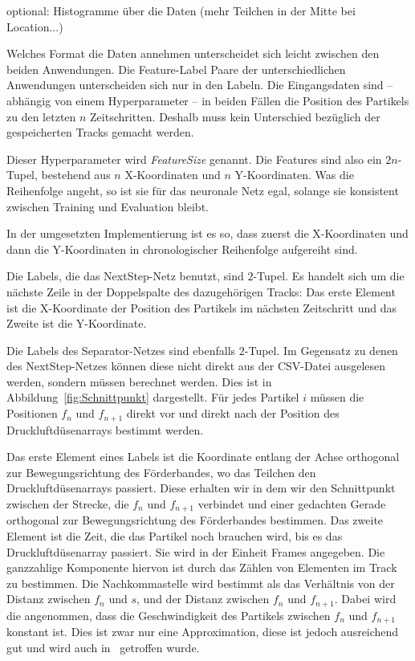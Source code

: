 optional: Histogramme über die Daten (mehr Teilchen in der Mitte bei Location...)
\color{black}

Welches Format die Daten annehmen unterscheidet sich leicht zwischen den beiden Anwendungen.
Die Feature-Label Paare der unterschiedlichen Anwendungen unterscheiden sich nur in den Labeln.
Die Eingangsdaten sind -- abhängig von einem Hyperparameter --
in beiden Fällen die Position des Partikels zu den letzten \(n\) Zeitschritten.
Deshalb muss kein Unterschied bezüglich der gespeicherten Tracks gemacht werden.

Dieser Hyperparameter wird \textit{FeatureSize} genannt. 
Die Features sind also ein \(2n\)-Tupel, bestehend aus \(n\) X-Koordinaten und \(n\) Y-Koordinaten.
Was die Reihenfolge angeht, so ist sie für das neuronale Netz egal, solange sie konsistent zwischen Training und Evaluation bleibt.

In der umgesetzten Implementierung ist es so, dass zuerst die X-Koordinaten 
und dann die Y-Koordinaten in chronologischer Reihenfolge aufgereiht sind. 



Die Labels, die das NextStep-Netz benutzt, sind \(2\)-Tupel.
Es handelt sich um die nächste Zeile in der Doppelspalte des dazugehörigen Tracks:
Das erste Element ist die X-Koordinate der Position des Partikels im nächsten Zeitschritt und das Zweite ist die Y-Koordinate.

Die Labels des Separator-Netzes sind ebenfalls \(2\)-Tupel.
Im Gegensatz zu denen des NextStep-Netzes können diese nicht direkt aus der CSV-Datei ausgelesen werden, sondern müssen berechnet werden.
Dies ist in Abbildung~\ref{fig:Schnittpunkt} dargestellt.
Für jedes Partikel \(i\) müssen die Positionen \(f_n\) und \(f_{n+1}\) direkt vor 
und direkt nach der Position des Druckluftdüsenarrays bestimmt werden.

Das erste Element eines Labels ist die Koordinate entlang der Achse orthogonal zur Bewegungsrichtung des Förderbandes, wo das Teilchen den Druckluftdüsenarrays passiert.
Diese erhalten wir in dem wir den Schnittpunkt zwischen der Strecke, die \(f_n\) und \(f_{n+1}\) verbindet und 
einer gedachten Gerade orthogonal zur Bewegungsrichtung des Förderbandes bestimmen.
Das zweite Element ist die Zeit, die das Partikel noch brauchen wird, bis es das Druckluftdüsenarray passiert.
Sie wird in der Einheit Frames angegeben.
Die ganzzahlige Komponente hiervon ist durch das Zählen von Elementen im Track zu bestimmen.
Die Nachkommastelle wird bestimmt als das Verhältnis von der Distanz zwischen \(f_n\) und \(s\), 
und der Distanz zwischen \(f_n\) und \(f_{n+1}\).
Dabei wird die angenommen, dass die Geschwindigkeit des Partikels zwischen \(f_n\) und \(f_{n+1}\) konstant ist.
Dies ist zwar nur eine Approximation, diese ist jedoch ausreichend gut und wird auch in~\cite{Pfaff2018} getroffen wurde.


